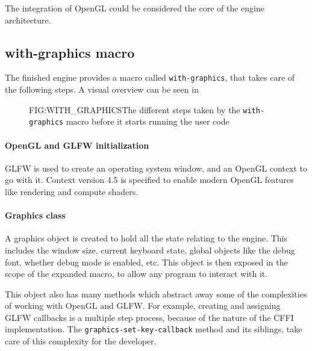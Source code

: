 

The integration of OpenGL could be considered the core of the engine architecture.

\subsection{with-graphics macro}

The finished engine provides a macro called \texttt{with-graphics},
that takes care of the following steps.
A visual overview can be seen in 

\begin{figure}[with-graphics macro sequence diagram]{FIG:WITH_GRAPHICS}{The different steps taken by the \texttt{with-graphics} macro before it starts running the user code}

\end{figure}

\paragraph{OpenGL and GLFW initialization}

GLFW is used to create an operating system window,
and an OpenGL context to go with it.
Context version 4.5 is specified to enable modern OpenGL features like rendering and compute shaders.

\paragraph{Graphics class}

A graphics object is created to hold all the state relating to the engine.
This includes the window size,
current keyboard state,
global objects like the debug font,
whether debug mode is enabled,
etc.
This object is then exposed in the scope of the expanded macro,
to allow any program to interact with it.

This object also has many methods which abstract away some of the complexities of working with OpenGL and GLFW.
For example,
creating and assigning GLFW callbacks is a multiple step process,
because of the nature of the CFFI implementation.
The \texttt{graphics-set-key-callback} method and its siblings,
take care of this complexity for the developer.

